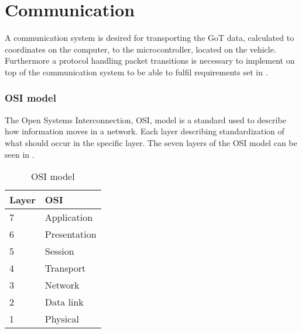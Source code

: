 \chapter{Communication}
A communication system is desired for transporting the GoT data, calculated to coordinates on the computer, to the microcontroller, located on the vehicle. Furthermore a protocol handling packet transitions is necessary to implement on top of the communication system to be able to fulfil requirements set in .


\subsection{OSI model}
The Open Systems Interconnection, OSI, model is a standard used to describe how information moves in a network. Each layer describing standardization of what should occur in the specific layer. The seven layers of the OSI model can be seen in .

\begin{table}[H]\centering
\begin{tabular}{|p{1.5cm}|p{3cm}|}
\hline%
  \textbf{Layer} & \textbf{OSI} \\
\hline%
    7 &    Application      \\
\hline%
    6 &    Presentation      \\
\hline%
    5 &    Session       \\
\hline%
    4 &    Transport    \\
\hline%
    3 &   Network     \\
\hline%
    2 &   Data link     \\
\hline%
    1 &    Physical     \\
\hline%
\end{tabular}
\caption{OSI model}
\label{tab:OSIModel}
\end{table}

